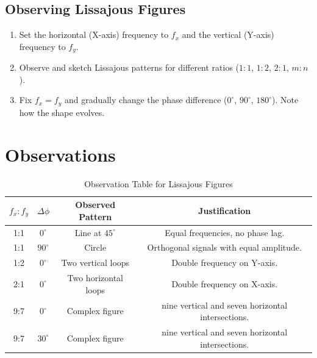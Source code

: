 \documentclass[a4paper,12pt]{article}
\begin{document}
\subsection*{\color{myred}Observing Lissajous Figures}
\begin{enumerate}
    \item Set the horizontal (X-axis) frequency to $f_x$ and the vertical (Y-axis) frequency to $f_y$.
    \item Observe and sketch Lissajous patterns for different ratios ($1:1$, $1:2$, $2:1$, $m:n$).
    \item Fix $f_x = f_y$ and gradually change the phase difference ($0^\circ$, $90^\circ$, $180^\circ$). Note how the shape evolves.
\end{enumerate}

\section*{\color{myblue}Observations}

\begin{table}[H]
\centering
{}\arrayrulewidth=1pt
\begin{tabular}{|c|c|c|c|}
\hline
\rowcolor{mygray} \textbf{$f_x : f_y$} & \textbf{$\Delta\phi$} & \textbf{Observed Pattern} & \textbf{Justification} \\\hline 
1:1 & $0^\circ$ & Line at $45^\circ$ & Equal frequencies, no phase lag. \\\hline
1:1 & $90^\circ$ & Circle & Orthogonal signals with equal amplitude. \\\hline
1:2 & $0^\circ$ & Two vertical loops & Double frequency on Y-axis. \\\hline
2:1 & $0^\circ$ & Two horizontal loops & Double frequency on X-axis. \\\hline
9:7 & $0^\circ$ & Complex figure & nine vertical and seven horizontal intersections. \\\hline
9:7 & $30^\circ$ & Complex figure & nine vertical and seven horizontal intersections. \\\hline
\end{tabular}
\caption{\color{myblue}Observation Table for Lissajous Figures}
\end{table}
\end{document}
